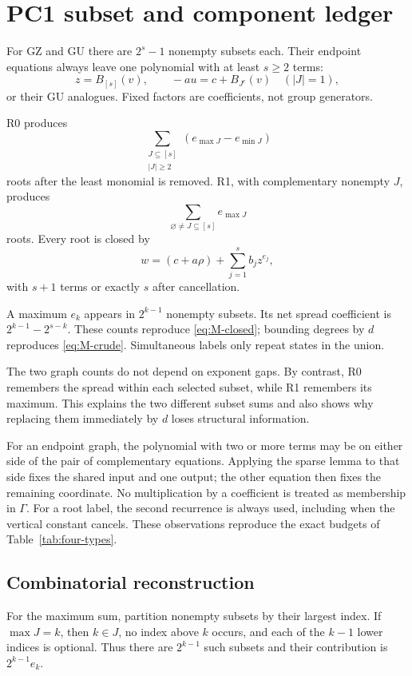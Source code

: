 \documentclass[11pt]{article}
\theoremstyle{definition}
\begin{document}
\section{PC1 subset and component ledger}
\label{app:pc1-ledger}

For GZ and GU there are \(2^s-1\) nonempty subsets each. Their endpoint equations always leave one polynomial with at least \(s\geq2\) terms:
\[
 z=B_{[s]}(v),\qquad
 -au=c+B_{J^c}(v)\quad(|J|=1),
\]
or their GU analogues. Fixed factors are coefficients, not group generators.

R0 produces
\[
 \sum_{\substack{J\subseteq[s]\\|J|\geq2}}
 (e_{\max J}-e_{\min J})
\]
roots after the least monomial is removed. R1, with complementary nonempty \(J\), produces
\[
 \sum_{\varnothing\neq J\subseteq[s]}e_{\max J}
\]
roots. Every root is closed by
\[
 w=(c+a\rho)+\sum_{j=1}^{s}b_jz^{e_j},
\]
with \(s+1\) terms or exactly \(s\) after cancellation.

A maximum \(e_k\) appears in \(2^{k-1}\) nonempty subsets. Its net spread coefficient is \(2^{k-1}-2^{s-k}\). These counts reproduce \eqref{eq:M-closed}; bounding degrees by \(d\) reproduces \eqref{eq:M-crude}. Simultaneous labels only repeat states in the union.


The two graph counts do not depend on exponent gaps. By contrast, R0 remembers the spread within each selected subset, while R1 remembers its maximum. This explains the two different subset sums and also shows why replacing them immediately by \(d\) loses structural information.

For an endpoint graph, the polynomial with two or more terms may be on either side of the pair of complementary equations. Applying the sparse lemma to that side fixes the shared input and one output; the other equation then fixes the remaining coordinate. No multiplication by a coefficient is treated as membership in \(\Gamma\). For a root label, the second recurrence is always used, including when the vertical constant cancels. These observations reproduce the exact budgets of Table~\ref{tab:four-types}.


\subsection*{Combinatorial reconstruction}

For the maximum sum, partition nonempty subsets by their largest index. If \(\max J=k\), then \(k\in J\), no index above \(k\) occurs, and each of the \(k-1\) lower indices is optional. Thus there are \(2^{k-1}\) such subsets and their contribution is \(2^{k-1}e_k\).
\end{document}
